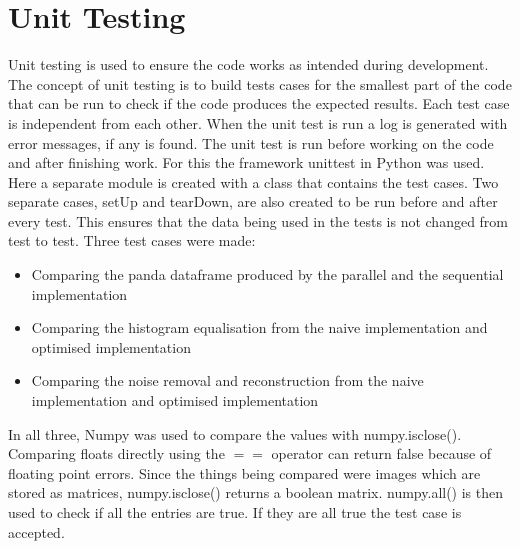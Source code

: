 \section{Unit Testing}
Unit testing is used to ensure the code works as intended during development. The concept of unit testing is to build tests cases for the smallest part of the code that can be run to check if the code produces the expected results. Each test case is independent from each other.  When the unit test is run a log is generated with error messages, if any is found. The unit test is run before working on the code and after finishing work.  For this the framework unittest in Python was used.  Here a separate module is created with a class that contains the test cases. Two separate cases, setUp and tearDown, are also created to be run before and after every test. This ensures that the data being used in the tests is not changed from test to test. Three test cases were made:

\begin{itemize}
\item Comparing the panda dataframe produced by the parallel and the sequential implementation
\item Comparing the histogram equalisation from the naive implementation and optimised implementation
\item Comparing the noise removal and reconstruction from the naive implementation and optimised implementation
\end{itemize}

\noindent
In all three, Numpy was used to compare the values with numpy.isclose(). Comparing floats directly using the  $==$ operator can return false because of floating point errors. Since the things being compared were images which are stored as matrices, numpy.isclose() returns a boolean matrix. numpy.all() is then used to check if all the entries are true. If they are all true the test case is accepted.